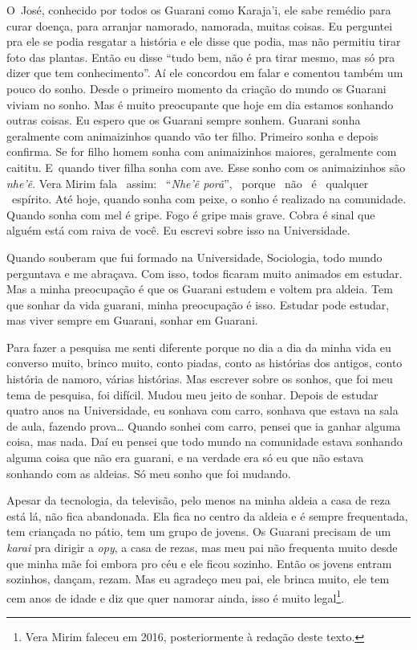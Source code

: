 O~José, conhecido por todos os Guarani como Karaja’i, ele sabe remédio
para curar doença, para arranjar namorado, namorada, muitas coisas. Eu
perguntei pra ele se podia resgatar a história e ele disse que podia,
mas não permitiu tirar foto das plantas. Então eu disse ``tudo bem, não
é pra tirar mesmo, mas só pra dizer que tem conhecimento''. Aí ele
concordou em falar e comentou também um pouco do sonho. Desde o
primeiro momento da criação do mundo os Guarani viviam no sonho. Mas é
muito preocupante que hoje em dia estamos sonhando outras coisas. Eu
espero que os Guarani sempre sonhem. Guarani sonha geralmente com
animaizinhos quando vão ter filho. Primeiro sonha e depois confirma. Se
for filho homem sonha com animaizinhos maiores, geralmente com caititu.
E~quando tiver filha sonha com ave. Esse sonho com os animaizinhos são
\emph{nhe’ẽ}. Vera Mirim fala ~assim: ~``\emph{Nhe’ẽ porã}'', ~porque ~não ~é
~qualquer ~espírito. Até hoje, quando sonha com peixe, o sonho é
realizado na comunidade. Quando sonha com mel é gripe. Fogo é gripe
mais grave. Cobra é sinal que alguém está com raiva de você. Eu escrevi
sobre isso na Universidade.

Quando souberam que fui formado na Universidade, Sociologia, todo mundo
perguntava e me abraçava. Com isso, todos ficaram muito animados em
estudar. Mas a minha preocupação é que os Guarani estudem e voltem pra
aldeia. Tem que sonhar da vida guarani, minha preocupação é isso.
Estudar pode estudar, mas viver sempre em Guarani, sonhar em Guarani.

Para fazer a pesquisa me senti diferente porque no dia a dia da minha
vida eu converso muito, brinco muito, conto piadas, conto as histórias
dos antigos, conto história de namoro, várias histórias. Mas escrever
sobre os sonhos, que foi meu tema de pesquisa, foi difícil. Mudou meu
jeito de sonhar. Depois de estudar quatro anos na Universidade, eu
sonhava com carro, sonhava que estava na sala de aula, fazendo prova\ldots{}
Quando sonhei com carro, pensei que ia ganhar alguma coisa, mas nada.
Daí eu pensei que todo mundo na comunidade estava sonhando alguma coisa
que não era guarani, e na verdade era só eu que não estava sonhando com
as aldeias. Só meu sonho que foi mudando.

Apesar da tecnologia, da televisão, pelo menos na minha aldeia a casa de
reza está lá, não fica abandonada. Ela fica no centro da aldeia e é
sempre frequentada, tem criançada no pátio, tem um grupo de jovens. Os
Guarani precisam de um \emph{karai} pra dirigir a \emph{opy}, a casa de rezas, mas
meu pai não frequenta muito desde que minha mãe foi embora pro céu e
ele ficou sozinho. Então os jovens entram sozinhos, dançam, rezam. Mas
eu agradeço meu pai, ele brinca muito, ele tem cem anos de idade e diz
que quer namorar ainda, isso é muito legal\footnote{Vera Mirim faleceu
em 2016, posteriormente à redação deste texto.}.

